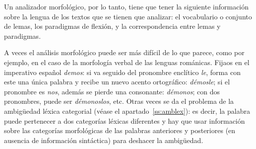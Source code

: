 Un analizador morfológico, por lo tanto, tiene que tener la siguiente información sobre la lengua de los textos que se tienen que analizar: el vocabulario o conjunto de lemas, los paradigmas de flexión, y la correspondencia entre lemas y paradigmas. 

A veces el análisis morfológico puede ser más difícil de lo que parece, como por ejemplo, en el caso de la morfología verbal de las lenguas románicas. Fijaos en el imperativo español \emph{demos}: si va seguido del pronombre enclítico \emph{le}, forma con este una única palabra y recibe un nuevo acento ortográfico: \emph{démosle}; si el pronombre es \emph{nos}, además se pierde una consonante: \emph{démonos}; con dos pronombres, puede ser {\em démonoslos}, etc. Otras veces se da el problema de la ambigüedad léxica categorial (véase el apartado~\ref{ss:amblex}): es decir, la palabra puede pertenecer a dos categorías léxicas diferentes y hay que usar información sobre las categorías morfológicas de las palabras anteriores y posteriores (en ausencia de información sintáctica) para deshacer la ambigüedad. 

